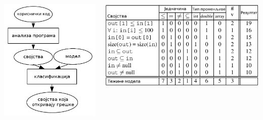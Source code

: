 \documentclass{beamer}
\begin{document}
\begin{frame}[fragile]
\begin{columns}
\begin{column}{0.35\textwidth}
    \begin{center}
        \includegraphics[scale=0.16]{./slike/latent_flow.png}
    \end{center}
\end{column}
\begin{column}{0.65\textwidth}  %
    \begin{center}
        \includegraphics[scale=0.14]{./slike/latent_errors_table.png}
    \end{center}
\end{column}
\end{columns}
\end{frame}
\end{document}
